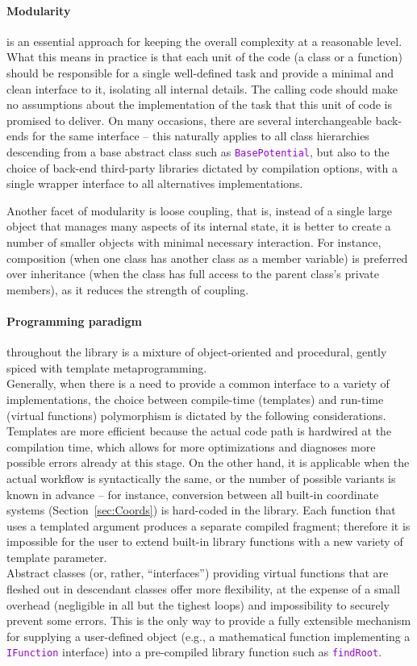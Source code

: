 \documentclass[12pt]{article}
\newcommand{\ttt}[1]{\textcolor{darkviolet}{\texttt{#1}}}
\begin{document}
\paragraph{Modularity} is an essential approach for keeping the overall complexity at a reasonable level. What this means in practice is that each unit of the code (a class or a function) should be responsible for a single well-defined task and provide a minimal and clean interface to it, isolating all internal details. The calling code should make no assumptions about the implementation of the task that this unit of code is promised to deliver. On many occasions, there are several interchangeable back-ends for the same interface -- this naturally applies to all class hierarchies descending from a base abstract class such as \ttt{BasePotential}, but also to the choice of back-end third-party libraries dictated by compilation options, with a single wrapper interface to all alternatives implementations.

Another facet of modularity is loose coupling, that is, instead of a single large object that manages many aspects of its internal state, it is better to create a number of smaller objects with minimal necessary interaction. For instance, composition (when one class has another class as a member variable) is preferred over inheritance (when the class has full access to the parent class's private members), as it reduces the strength of coupling.

\paragraph{Programming paradigm} throughout the library is a mixture of object-oriented and procedural, gently spiced with template metaprogramming.\\
Generally, when there is a need to provide a common interface to a variety of implementations, the choice between compile-time (templates) and run-time (virtual functions) polymorphism is dictated by the following considerations.\\
Templates are more efficient because the actual code path is hardwired at the compilation time, which allows for more optimizations and diagnoses more possible errors already at this stage. On the other hand, it is applicable when the actual workflow is syntactically the same, or the number of possible variants is known in advance -- for instance, conversion between all built-in coordinate systems (Section~\ref{sec:Coords}) is hard-coded in the library. Each function that uses a templated argument produces a separate compiled fragment; therefore it is impossible for the user to extend built-in library functions with a new variety of template parameter.\\
Abstract classes (or, rather, ``interfaces'') providing virtual functions that are fleshed out in descendant classes offer more flexibility, at the expense of a small overhead (negligible in all but the tighest loops) and impossibility to securely prevent some errors. This is the only way to provide a fully extensible mechanism for supplying a user-defined object (e.g., a mathematical function implementing a \ttt{IFunction} interface) into a pre-compiled library function such as \ttt{findRoot}.
\end{document}
